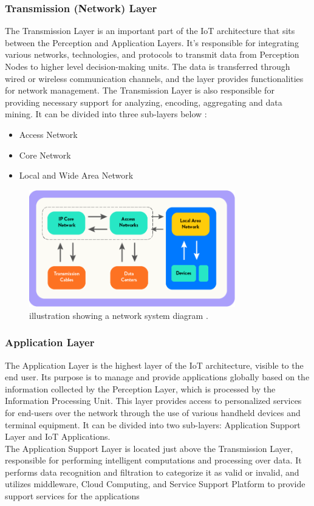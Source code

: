 \documentclass[12pt]{report}
\begin{document}
	\subsubsection{Transmission (Network) Layer}
	The Transmission Layer is an important part of the IoT architecture that sits between the Perception and Application Layers. It's responsible for integrating various networks, technologies, and protocols to transmit data from Perception Nodes to higher level decision-making units. The data is transferred through wired or wireless communication channels, and the layer provides functionalities for network management. The Transmission Layer is also responsible for providing necessary support for analyzing, encoding, aggregating and data mining. It can be divided into three sub-layers below :
	\begin{itemize}
		\item Access Network
		\item Core Network
		\item Local and Wide Area Network
	\end{itemize}
	\begin{figure}[H]
	\centering
	\includegraphics[width=0.8\textwidth]{network}
	\caption{illustration showing a network system diagram
		\cite{sustainablewebdesign}.}
	\label{fig:networklayer}
\end{figure}
	\subsubsection{Application Layer}
	The Application Layer is the highest layer of the IoT architecture, visible to the end user. Its purpose is to manage and provide applications globally based on the information collected by the Perception Layer, which is processed by the Information Processing Unit. This layer provides access to personalized services for end-users over the network through the use of various handheld devices and terminal equipment. It can be divided into two sub-layers: Application Support Layer and IoT Applications.\\
	 The Application Support Layer is located just above the Transmission Layer, responsible for performing intelligent computations and processing over data. It performs data recognition and filtration to categorize it as valid or invalid, and utilizes middleware, Cloud Computing, and Service Support Platform to provide support services for the applications
	
\end{document}
